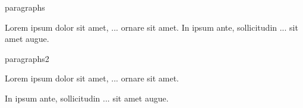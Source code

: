     

\begin{saveblock}{paragraphs}
    \begin{highlightblock}[linewidth=0.5\textwidth,gobble=12]
        Lorem ipsum dolor sit amet,
        ... ornare sit amet.
        In ipsum ante, sollicitudin
        ... sit amet augue.
    \end{highlightblock}
\end{saveblock}

\begin{saveblock}{paragraphs2}
    \begin{highlightblock}[linewidth=0.5\textwidth,gobble=12]
        Lorem ipsum dolor sit amet,
        ... ornare sit amet.
        
        In ipsum ante, sollicitudin
        ... sit amet augue.
    \end{highlightblock}
\end{saveblock}


